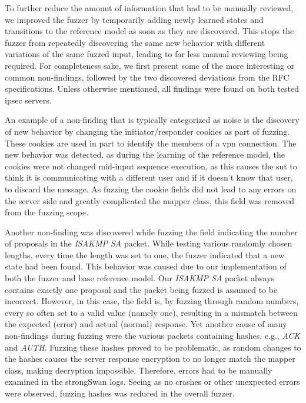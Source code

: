To further reduce the amount of information that had to be manually reviewed, we improved the fuzzer by temporarily adding newly learned states and transitions to the reference model as soon as they are discovered. This stops the fuzzer from repeatedly discovering the same new behavior with different variations of the same fuzzed input, leading to far less manual reviewing being required. For completeness sake, we first present some of the more interesting or common non-findings, followed by the two discovered deviations from the RFC specifications. Unless otherwise mentioned, all findings were found on both tested \ac{ipsec} servers.

An example of a non-finding that is typically categorized as noise is the discovery of new behavior by changing the initiator/responder cookies as part of fuzzing. These cookies are used in part to identify the members of a \ac{vpn} connection. The new behavior was detected, as during the learning of the reference model, the cookies were not changed mid-input sequence execution, as this causes the \ac{sut} to think it is communicating with a different user and if it doesn't know that user, to discard the message. As fuzzing the cookie fields did not lead to any errors on the server side and greatly complicated the mapper class, this field was removed from the fuzzing scope. 

Another non-finding was discovered while fuzzing the field indicating the number of proposals in the \emph{ISAKMP SA} packet. While testing various randomly chosen lengths, every time the length was set to one, the fuzzer indicated that a new state had been found. This behavior was caused due to our implementation of both the fuzzer and base reference model. Our \emph{ISAKMP SA} packet always contains exactly one proposal and the packet being fuzzed is assumed to be incorrect. However, in this case, the field is, by fuzzing through random numbers, every so often set to a valid value (namely one), resulting in a mismatch between the expected (error) and actual (normal) response. 
Yet another cause of many non-findings during fuzzing were the various packets containing hashes, e.g., \emph{ACK} and \emph{AUTH}. Fuzzing these hashes proved to be problematic, as random changes to the hashes causes the server response encryption to no longer match the mapper class, making decryption impossible. Therefore, errors had to be manually examined in the strongSwan logs. Seeing as no crashes or other unexpected errors were observed, fuzzing hashes was reduced in the overall fuzzer. 

